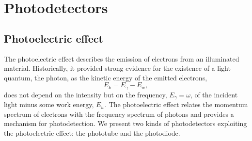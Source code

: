 \section{Photodetectors}\label{sec:photodetectors}


\subsection{Photoelectric effect}

The photoelectric effect describes the emission of electrons from an illuminated material.
Historically, it provided strong evidence for the existence of a light quantum, the photon, as the kinetic energy of the emitted electrons,
\begin{equation}
	E_k
	=
	E_\gamma
	-
	E_w
	\label{eq:photoelectric_effect}
	,
\end{equation}
does not depend on the intensity but on the frequency, $E_\gamma=\omega$, of the incident light minus some work energy, $E_w$.
The photoelectric effect relates the momentum spectrum of electrons with the frequency spectrum of photons and provides a mechanism for photodetection.
We present two kinds of photodetectors exploiting the photoelectric effect: the phototube and the photodiode.

